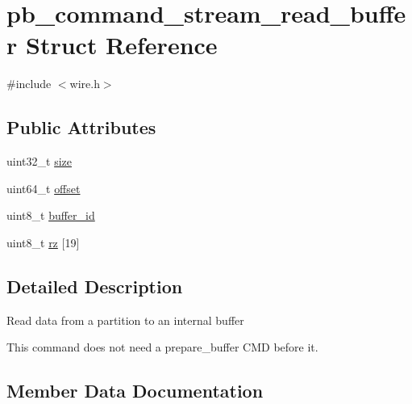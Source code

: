 \hypertarget{structpb__command__stream__read__buffer}{}\section{pb\+\_\+command\+\_\+stream\+\_\+read\+\_\+buffer Struct Reference}
\label{structpb__command__stream__read__buffer}


{\ttfamily \#include $<$wire.\+h$>$}

\subsection*{Public Attributes}
\begin{DoxyCompactItemize}
\item 
uint32\+\_\+t \hyperlink{structpb__command__stream__read__buffer_a68276a1d4200270fc50e5575bc727108}{size}
\item 
uint64\+\_\+t \hyperlink{structpb__command__stream__read__buffer_acc87519cac4a49e9a39785671f196eca}{offset}
\item 
uint8\+\_\+t \hyperlink{structpb__command__stream__read__buffer_a9f5fdcf5c7f015077fb2e652a881fcae}{buffer\+\_\+id}
\item 
uint8\+\_\+t \hyperlink{structpb__command__stream__read__buffer_a5b6337bd93c4645553a7f9e5d7b3c0a6}{rz} \mbox{[}19\mbox{]}
\end{DoxyCompactItemize}


\subsection{Detailed Description}
Read data from a partition to an internal buffer

This command does not need a prepare\+\_\+buffer C\+MD before it. 

\subsection{Member Data Documentation}
\mbox{\label{structpb__command__stream__read__buffer_a9f5fdcf5c7f015077fb2e652a881fcae}} 
